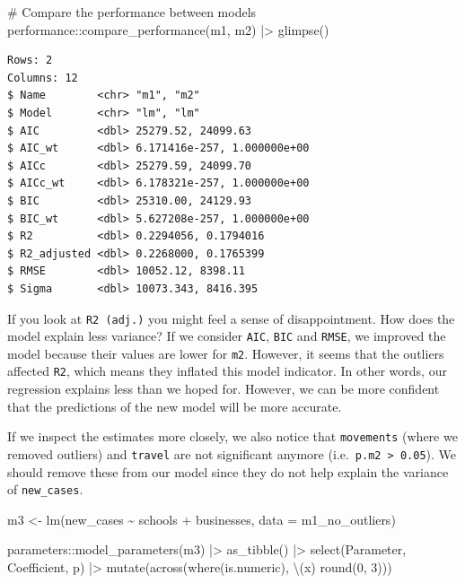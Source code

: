 \documentclass[
  letterpaper,
]{krantz}
\makeatletter
\newenvironment{Shaded}{\begin{snugshade}}{\end{snugshade}}
\newcommand{\AttributeTok}[1]{\textcolor[rgb]{0.40,0.45,0.13}{#1}}
\newcommand{\CommentTok}[1]{\textcolor[rgb]{0.37,0.37,0.37}{#1}}
\newcommand{\DecValTok}[1]{\textcolor[rgb]{0.68,0.00,0.00}{#1}}
\newcommand{\FunctionTok}[1]{\textcolor[rgb]{0.28,0.35,0.67}{#1}}
\newcommand{\NormalTok}[1]{\textcolor[rgb]{0.00,0.23,0.31}{#1}}
\newcommand{\OtherTok}[1]{\textcolor[rgb]{0.00,0.23,0.31}{#1}}
\newcommand{\SpecialCharTok}[1]{\textcolor[rgb]{0.37,0.37,0.37}{#1}}
\newenvironment{kframe}{%
\medskip{}
\setlength{\fboxsep}{.8em}
 \def\at@end@of@kframe{}%
 \ifinner\ifhmode%
  \def\at@end@of@kframe{\end{minipage}}%
  \begin{minipage}{\columnwidth}%
 \fi\fi%
 \def\FrameCommand##1{\hskip\@totalleftmargin \hskip-\fboxsep
 \colorbox{shadecolor}{##1}\hskip-\fboxsep
     \hskip-\linewidth \hskip-\@totalleftmargin \hskip\columnwidth}%
 \MakeFramed {\advance\hsize-\width
   \@totalleftmargin\z@ \linewidth\hsize
   \@setminipage}}%
 {\par\unskip\endMakeFramed%
 \at@end@of@kframe}
\renewenvironment{Shaded}{\begin{kframe}}{\end{kframe}}
\makeatother
\begin{document}
\begin{Shaded}
\begin{Highlighting}[]
\CommentTok{\# Compare the performance between models}
\NormalTok{performance}\SpecialCharTok{::}\FunctionTok{compare\_performance}\NormalTok{(m1, m2) }\SpecialCharTok{|\textgreater{}}
  \FunctionTok{glimpse}\NormalTok{()}
\end{Highlighting}
\end{Shaded}

\begin{verbatim}
Rows: 2
Columns: 12
$ Name        <chr> "m1", "m2"
$ Model       <chr> "lm", "lm"
$ AIC         <dbl> 25279.52, 24099.63
$ AIC_wt      <dbl> 6.171416e-257, 1.000000e+00
$ AICc        <dbl> 25279.59, 24099.70
$ AICc_wt     <dbl> 6.178321e-257, 1.000000e+00
$ BIC         <dbl> 25310.00, 24129.93
$ BIC_wt      <dbl> 5.627208e-257, 1.000000e+00
$ R2          <dbl> 0.2294056, 0.1794016
$ R2_adjusted <dbl> 0.2268000, 0.1765399
$ RMSE        <dbl> 10052.12, 8398.11
$ Sigma       <dbl> 10073.343, 8416.395
\end{verbatim}

If you look at \texttt{R2\ (adj.)} you might feel a sense of
disappointment. How does the model explain less variance? If we consider
\texttt{AIC}, \texttt{BIC} and \texttt{RMSE}, we improved the model
because their values are lower for \texttt{m2}. However, it seems that
the outliers affected \texttt{R2}, which means they inflated this model
indicator. In other words, our regression explains less than we hoped
for. However, we can be more confident that the predictions of the new
model will be more accurate.

If we inspect the estimates more closely, we also notice that
\texttt{movements} (where we removed outliers) and \texttt{travel} are
not significant anymore (i.e.~\texttt{p.m2\ \textgreater{}\ 0.05}). We
should remove these from our model since they do not help explain the
variance of \texttt{new\_cases}.

\begin{Shaded}
\begin{Highlighting}[]
\NormalTok{m3 }\OtherTok{\textless{}{-}} \FunctionTok{lm}\NormalTok{(new\_cases }\SpecialCharTok{\textasciitilde{}}\NormalTok{ schools }\SpecialCharTok{+}\NormalTok{ businesses,}
         \AttributeTok{data =}\NormalTok{ m1\_no\_outliers)}

\NormalTok{parameters}\SpecialCharTok{::}\FunctionTok{model\_parameters}\NormalTok{(m3) }\SpecialCharTok{|\textgreater{}}
  \FunctionTok{as\_tibble}\NormalTok{() }\SpecialCharTok{|\textgreater{}}
  \FunctionTok{select}\NormalTok{(Parameter, Coefficient, p) }\SpecialCharTok{|\textgreater{}}
  \FunctionTok{mutate}\NormalTok{(}\FunctionTok{across}\NormalTok{(}\FunctionTok{where}\NormalTok{(is.numeric), \textbackslash{}(x) }\FunctionTok{round}\NormalTok{(}\DecValTok{0}\NormalTok{, }\DecValTok{3}\NormalTok{)))}
\end{Highlighting}
\end{Shaded}
\end{document}
